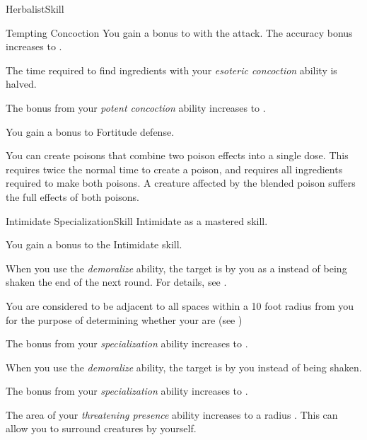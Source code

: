 \begin{feat}{Herbalist}{Skill}
\begin{attuneability}{Tempting Concoction}
            \rankline
             You gain a  bonus to  with the attack.
             The accuracy bonus increases to .
        \end{attuneability}

         The time required to find ingredients with your \textit{esoteric concoction} ability is halved.

         The bonus from your \textit{potent concoction} ability increases to .

         You gain a  bonus to Fortitude defense.

         You can create poisons that combine two poison effects into a single dose.
        This requires twice the normal time to create a poison, and requires all ingredients required to make both poisons.
        A creature affected by the blended poison suffers the full effects of both poisons.
    \end{feat}

    \begin{feat}{Intimidate Specialization}{Skill}
        \featpre Intimidate as a mastered skill.

         You gain a  bonus to the Intimidate skill.

         When you use the \textit{demoralize} ability, the target is \shaken by you as a  instead of being shaken the end of the next round.
        For details, see .

         You are considered to be adjacent to all spaces within a 10 foot radius  from you for the purpose of determining whether your  are \surrounded (see )

         The bonus from your \textit{specialization} ability increases to .

         When you use the \textit{demoralize} ability, the target is \frightened by you instead of being shaken.

         The bonus from your \textit{specialization} ability increases to .

         The area of your \textit{threatening presence} ability increases to a \areasmall radius .
        This can allow you to surround creatures by yourself.
    \end{feat}

